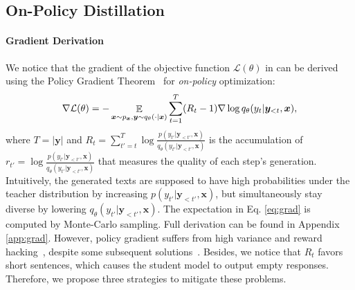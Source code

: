 \documentclass{article}
\def\expct{\mathop{\mathbb{E}}}
\def\pst{q_{\theta}(y_t | \by_{<t}, \bx)}
\def\pstp{q_{\theta}(y_{t'} | \by_{<t'}, \bx)}
\def\pttp{p(y_{t'} | \by_{<t'}, \bx)}
\def\bx{\bm{x}}
\def\by{\bm{y}}
\begin{document}
\subsection{On-Policy Distillation}

\label{sec:rl_optim}

\vspace{-2pt}

\paragraph{Gradient Derivation} 
We notice that the gradient of the objective function $\mathcal{L}(\theta)$ in  can be derived using the Policy Gradient Theorem~\citep{reinforce,max_ent_rl} for \textit{on-policy} optimization:
\begin{equation}
    \small
    \label{eq:grad}
    \nabla \mathcal{L}(\theta) = -\expct_{\bx \sim p_{\bx}, \by \sim q_{\theta}(\cdot | \bx)} \sum_{t=1}^T (R_t-1) \nabla \log \pst,
\end{equation}
where $T=|\by|$ and $R_t =  \sum_{t'=t}^T \log \frac{\pttp}{\pstp}$ is the accumulation of $r_{t'}=\log \frac{\pttp}{\pstp}$ that measures the quality of each step's generation. Intuitively, the generated texts are supposed to have high probabilities under the teacher distribution by increasing $\pttp$, but simultaneously stay diverse by lowering $\pstp$. The expectation in Eq. \ref{eq:grad} is computed by Monte-Carlo sampling. Full derivation can be found in Appendix \ref{app:grad}. However, policy gradient suffers from high variance and reward hacking~\citep{reward_hacking}, despite some subsequent solutions~\citep{ppo}. Besides, we notice that $R_t$ favors short sentences, which causes the student model to output empty responses. Therefore, we propose three strategies to mitigate these problems.

\vspace{-2pt}
\end{document}
